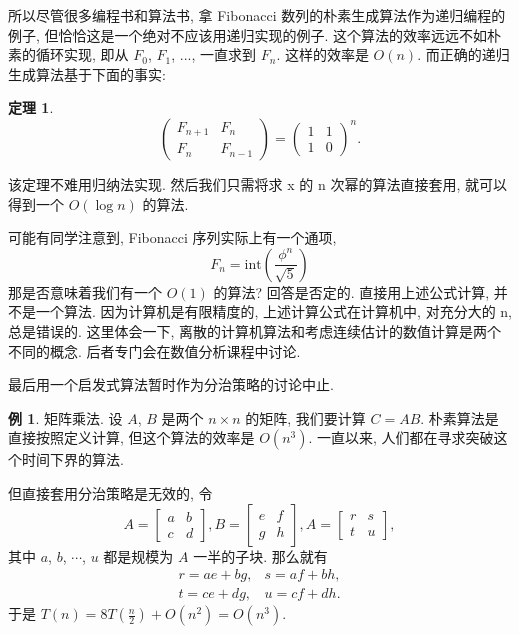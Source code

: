 \documentclass[a4paper]{ctexart}
\newtheorem{theorem}{定理}
\theoremstyle{definition}
\theoremstyle{definition}
\newtheorem{example}{例}[section]
\begin{document}
所以尽管很多编程书和算法书, 拿 Fibonacci 数列的朴素生成算法作为递归编程的例子, 但恰恰这是一个绝对不应该用递归实现的例子. 
这个算法的效率远远不如朴素的循环实现, 即从 $F_0$, $F_1$, $...$, 一直求到 $F_n$. 这样的效率是 $O(n)$.
而正确的递归生成算法基于下面的事实:

\begin{theorem}
\begin{equation}
  \left(
  \begin{array}{cc}
    F_{n + 1} & F_n \\
    F_n & F_{n - 1}
  \end{array}
  \right) = \left(
  \begin{array}{cc}
    1 & 1 \\
    1 & 0 
  \end{array}  
  \right)^n.
\end{equation}
\end{theorem}

该定理不难用归纳法实现. 然后我们只需将求 x 的 n 次幂的算法直接套用, 就可以得到一个 $O(\log n)$ 的算法. 

可能有同学注意到, Fibonacci 序列实际上有一个通项, 
\begin{equation}
  F_n = \mathrm{int} \left( \frac{\phi^n}{\sqrt{5}} \right)
\end{equation}
那是否意味着我们有一个 $O(1)$ 的算法? 回答是否定的. 直接用上述公式计算, 并不是一个算法. 因为计算机是有限精度的, 上述计算公式在计算机中, 
对充分大的 n, 总是错误的. 这里体会一下, 离散的计算机算法和考虑连续估计的数值计算是两个不同的概念. 后者专门会在数值分析课程中讨论. 

最后用一个启发式算法暂时作为分治策略的讨论中止. 

\begin{example}
  矩阵乘法. 设 $A$, $B$ 是两个 $n \times n$ 的矩阵, 我们要计算 $C = AB$.
  朴素算法是直接按照定义计算, 但这个算法的效率是 $O(n^3)$. 一直以来, 人们都在寻求突破这个时间下界的算法.
\end{example}

但直接套用分治策略是无效的, 令
\begin{equation}
  A = \left[
    \begin{array}{cc}
      a & b \\
      c & d
    \end{array}
  \right], 
  B = \left[
    \begin{array}{cc}
      e & f \\
      g & h
    \end{array}
  \right], 
  A = \left[
    \begin{array}{cc}
      r & s \\
      t & u 
    \end{array}
  \right], 
\end{equation}
其中 $a$, $b$, $\cdots$, $u$ 都是规模为 $A$ 一半的子块. 那么就有
\begin{equation}
  \begin{array}{ll}
    r = a e + b g, & s = a f + b h, \\
    t = c e + d g, & u = c f + d h.
  \end{array}
\end{equation}
于是 $T(n) = 8 T(\frac{n}{2}) + O(n^2) = O(n^3)$.
\end{document}

